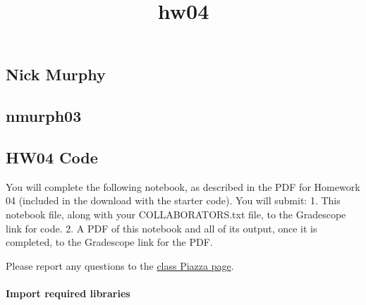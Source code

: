 \documentclass[11pt]{article}
\title{hw04}
\begin{document}
    
    \maketitle
    
    

    
    \hypertarget{nick-murphy}{%
\subsection{Nick Murphy}\label{nick-murphy}}

\hypertarget{nmurph03}{%
\subsection{nmurph03}\label{nmurph03}}

    \hypertarget{hw04-code}{%
\subsection{HW04 Code}\label{hw04-code}}

You will complete the following notebook, as described in the PDF for
Homework 04 (included in the download with the starter code). You will
submit: 1. This notebook file, along with your COLLABORATORS.txt file,
to the Gradescope link for code. 2. A PDF of this notebook and all of
its output, once it is completed, to the Gradescope link for the PDF.

Please report any questions to the
\href{piazza.com/tufts/spring2021/comp135}{class Piazza page}.

\hypertarget{import-required-libraries}{%
\paragraph{Import required libraries}\label{import-required-libraries}}
\end{document}
